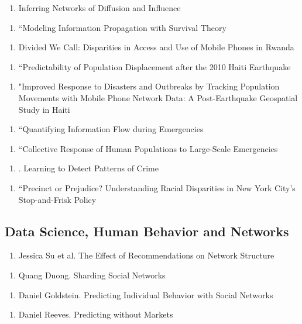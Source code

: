  \begin{enumerate}
\item Inferring Networks of Diffusion and Influence
\end{enumerate}
\begin{enumerate}
\item “Modeling Information Propagation with Survival Theory
\end{enumerate}
\begin{enumerate}
\item Divided We Call: Disparities in Access and Use of Mobile Phones in Rwanda
\end{enumerate}
\begin{enumerate}
\item “Predictability of Population Displacement after the 2010 Haiti Earthquake
\end{enumerate}
\begin{enumerate}
\item "Improved Response to Disasters and Outbreaks by Tracking Population Movements with Mobile Phone Network Data: A Post-Earthquake Geospatial Study in Haiti
\end{enumerate}
\begin{enumerate}
\item “Quantifying Information Flow during Emergencies
\end{enumerate}
\begin{enumerate}
\item “Collective Response of Human Populations to Large-Scale Emergencies
\end{enumerate}
\begin{enumerate}
\item . Learning to Detect Patterns of Crime
\end{enumerate}
\begin{enumerate}
\item “Precinct or Prejudice? Understanding Racial Disparities in New York City’s Stop-and-Frisk Policy
\end{enumerate}

\subsection{Data Science, Human Behavior and Networks}
\begin{enumerate}
\item Jessica Su et al. The Effect of Recommendations on Network Structure
\end{enumerate}
\begin{enumerate}
\item Quang Duong. Sharding Social Networks
\end{enumerate}
\begin{enumerate}
\item Daniel Goldstein. Predicting Individual Behavior with Social Networks
\end{enumerate}
\begin{enumerate}
\item Daniel Reeves. Predicting without Markets
\end{enumerate}


